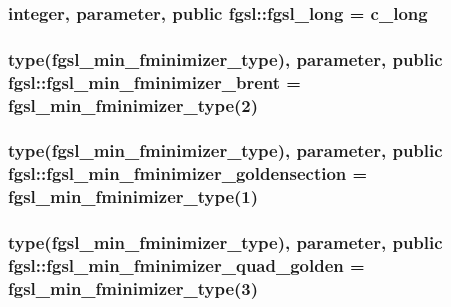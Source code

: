 \subsubsection[{fgsl\+\_\+long}]{\setlength{\rightskip}{0pt plus 5cm}integer, parameter, public fgsl\+::fgsl\+\_\+long = c\+\_\+long}\label{namespacefgsl_a22fca1111887118eb07d5f9688ea38ad}
\hypertarget{namespacefgsl_a0434a8f5d054ed9038714a856f8937ad}{}
\subsubsection[{fgsl\+\_\+min\+\_\+fminimizer\+\_\+brent}]{\setlength{\rightskip}{0pt plus 5cm}type({\bf fgsl\+\_\+min\+\_\+fminimizer\+\_\+type}), parameter, public fgsl\+::fgsl\+\_\+min\+\_\+fminimizer\+\_\+brent = {\bf fgsl\+\_\+min\+\_\+fminimizer\+\_\+type}(2)}\label{namespacefgsl_a0434a8f5d054ed9038714a856f8937ad}
\hypertarget{namespacefgsl_a372d8c5ea330e874febcdaf090c8f8fc}{}
\subsubsection[{fgsl\+\_\+min\+\_\+fminimizer\+\_\+goldensection}]{\setlength{\rightskip}{0pt plus 5cm}type({\bf fgsl\+\_\+min\+\_\+fminimizer\+\_\+type}), parameter, public fgsl\+::fgsl\+\_\+min\+\_\+fminimizer\+\_\+goldensection = {\bf fgsl\+\_\+min\+\_\+fminimizer\+\_\+type}(1)}\label{namespacefgsl_a372d8c5ea330e874febcdaf090c8f8fc}
\hypertarget{namespacefgsl_a7c479328d8e7e7d55f2fa4908d0122c9}{}
\subsubsection[{fgsl\+\_\+min\+\_\+fminimizer\+\_\+quad\+\_\+golden}]{\setlength{\rightskip}{0pt plus 5cm}type({\bf fgsl\+\_\+min\+\_\+fminimizer\+\_\+type}), parameter, public fgsl\+::fgsl\+\_\+min\+\_\+fminimizer\+\_\+quad\+\_\+golden = {\bf fgsl\+\_\+min\+\_\+fminimizer\+\_\+type}(3)}\label{namespacefgsl_a7c479328d8e7e7d55f2fa4908d0122c9}
\hypertarget{namespacefgsl_a8d1aeaeb6d1cc87ec0d79eddf44965b8}{}
